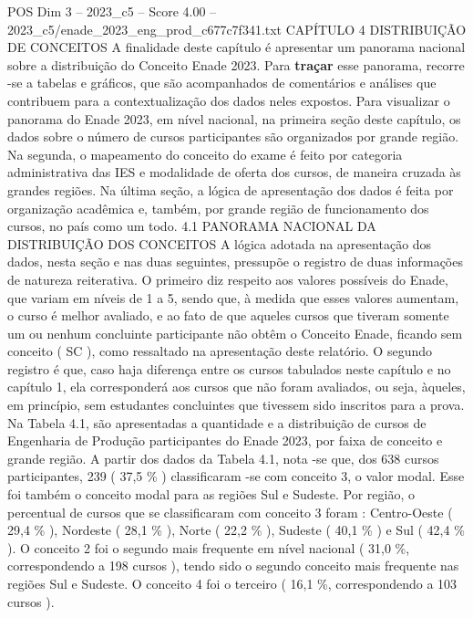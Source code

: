 \begin{textsample}{POS Dim 3 – 2023\_c5 – Score 4.00 – 2023\_c5/enade\_2023\_eng\_prod\_c677c7f341.txt}  \label{ex:f3_pos_060}
CAPÍTULO 4 DISTRIBUIÇÃO DE CONCEITOS A finalidade deste capítulo é apresentar um panorama nacional sobre a distribuição do Conceito Enade 2023.
Para \textbf{traçar} esse panorama, recorre -se a tabelas e gráficos, que são acompanhados de comentários e análises que contribuem para a contextualização dos dados neles expostos.
Para visualizar o panorama do Enade 2023, em nível nacional, na primeira seção deste capítulo, os dados sobre o número de cursos participantes são organizados por grande região.
Na segunda, o mapeamento do conceito do exame é feito por categoria administrativa das IES e modalidade de oferta dos cursos, de maneira cruzada às grandes regiões.
Na última seção, a lógica de apresentação dos dados é feita por organização acadêmica e, também, por grande região de funcionamento dos cursos, no país como um todo. 4.1 PANORAMA NACIONAL DA DISTRIBUIÇÃO DOS CONCEITOS A lógica adotada na apresentação dos dados, nesta seção e nas duas seguintes, pressupõe o registro de duas informações de natureza reiterativa.
O primeiro diz respeito aos valores possíveis do Enade, que variam em níveis de 1 a 5, sendo que, à medida que esses valores aumentam, o curso é melhor avaliado, e ao fato de que aqueles cursos que tiveram somente um ou nenhum concluinte participante não obtêm o Conceito Enade, ficando sem conceito ( SC ), como ressaltado na apresentação deste relatório.
O segundo registro é que, caso haja diferença entre os cursos tabulados neste capítulo e no capítulo 1, ela corresponderá aos cursos que não foram avaliados, ou seja, àqueles, em princípio, sem estudantes concluintes que tivessem sido inscritos para a prova.
Na Tabela 4.1, são apresentadas a quantidade e a distribuição de cursos de Engenharia de Produção participantes do Enade 2023, por faixa de conceito e grande região.
A partir dos dados da Tabela 4.1, nota -se que, dos 638 cursos participantes, 239 ( 37,5 \% ) classificaram -se com conceito 3, o valor modal.
Esse foi também o conceito modal para as regiões Sul e Sudeste.
Por região, o percentual de cursos que se classificaram com conceito 3 foram : Centro-Oeste ( 29,4 \% ), Nordeste ( 28,1 \% ), Norte ( 22,2 \% ), Sudeste ( 40,1 \% ) e Sul ( 42,4 \% ).
O conceito 2 foi o segundo mais frequente em nível nacional ( 31,0 \%, correspondendo a 198 cursos ), tendo sido o segundo conceito mais frequente nas regiões Sul e Sudeste.
O conceito 4 foi o terceiro ( 16,1 \%, correspondendo a 103 cursos ).

\end{textsample}
